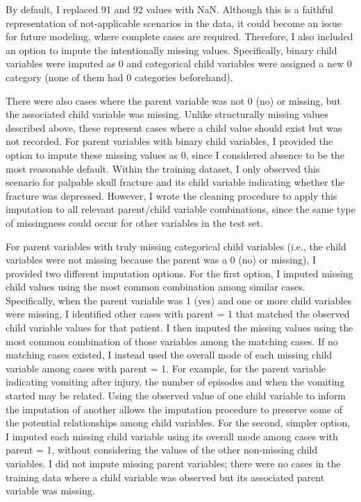 \documentclass[11pt,letterpaper]{article}
\begin{document}
By default, I replaced 91 and 92 values with NaN. Although this is a faithful representation of not-applicable
scenarios in the data, it could become an issue for future modeling, where complete cases are required.
Therefore, I also included an option to impute the intentionally missing values. Specifically, 
binary child variables were imputed as 0 and categorical child variables were assigned a new 0 category
(none of them had 0 categories beforehand).

There were also cases where the parent variable was not 0 (no) or missing, but the associated child variable
was missing. Unlike structurally missing values described above, these represent cases where a child
value should exist but was not recorded. For parent variables with binary child variables, 
I provided the option to impute these missing values as 0, since I considered absence to be the
most reasonable default. Within the training dataset,
I only observed this scenario for palpable skull fracture and its child variable indicating
whether the fracture was depressed. However, I wrote the cleaning procedure to apply 
this imputation to all relevant parent/child variable combinations, since the
same type of missingness could occur for other variables in the test set. 

For parent variables with truly missing categorical child variables (i.e., the child variables
were not missing because the parent was a 0 (no) or missing), I provided two different imputation options. 
For the first option, I imputed missing child values using the most common combination among
similar cases. Specifically, when the parent variable was 1 (yes) and one or more child variables
were missing, I identified other cases with parent = 1 that matched the observed child variable
values for that patient. I then imputed the missing values using the most common 
combination of those variables among the matching cases. If no matching cases existed, 
I instead used the overall mode of each missing child variable among cases with parent = 1.
For example, for the parent variable indicating vomiting after injury, 
the number of episodes and when the vomiting started may be related. 
Using the observed value of one child variable to inform the imputation of another 
allows the imputation procedure to preserve some of the potential relationships
among child variables. For the second, simpler option, I imputed each missing 
child variable using its overall mode among cases with parent = 1, without
considering the values of the other non-missing child variables. 
I did not impute missing parent variables; there were no cases in the training data where 
a child variable was observed but its associated parent variable was missing.
\end{document}
